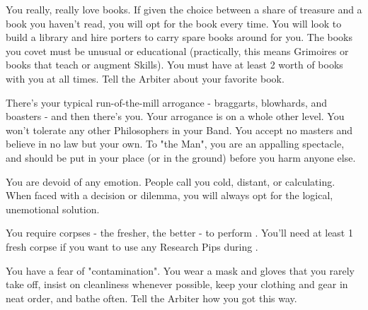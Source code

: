 \begin{multicols*}{2}
\cbreak



    \begin{center}
    \end{center}



  You really, really love books. If given the choice between a share of treasure and a book you haven't read, you will opt for the book every time. You will look to build a library and hire porters to carry spare books around for you. The books you covet must be unusual or educational (practically, this means Grimoires or books that teach or augment Skills). You must have at least 2  worth of books with you at all times. Tell the Arbiter about your favorite book.


  There's your typical run-of-the-mill arrogance - braggarts, blowhards, and boasters - and then there's you. Your arrogance is on a whole other level. You won't tolerate any other Philosophers in your Band. You accept no masters and believe in no law but your own. To "the Man", you are an appalling spectacle, and should be put in your place (or in the ground) before you harm anyone else.


  You are devoid of any emotion. People call you cold, distant, or calculating. When faced with a decision or dilemma, you will always opt for the logical, unemotional solution.



  You require corpses - the fresher, the better - to perform . You'll need at least 1 fresh corpse if you want to use any Research Pips during .


  You have a fear of "contamination". You wear a mask and gloves that you rarely take off, insist on cleanliness whenever possible, keep your clothing and gear in neat order, and bathe often. Tell the Arbiter how you got this way.


\end{multicols*}
